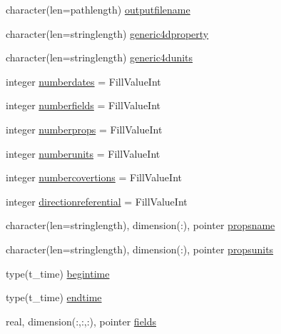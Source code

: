 \begin{DoxyCompactItemize}
\item 
character(len=pathlength) \mbox{\hyperlink{structmodulereadswannonstationary_1_1t__swan_a1fa9a8c9c48380839314e5e4dc5705a4}{outputfilename}}
\item 
character(len=stringlength) \mbox{\hyperlink{structmodulereadswannonstationary_1_1t__swan_a4e9260c8b4defd2db378d4c9a5763238}{generic4dproperty}}
\item 
character(len=stringlength) \mbox{\hyperlink{structmodulereadswannonstationary_1_1t__swan_af4045afaf35a49e30f9b3718878a1f3e}{generic4dunits}}
\item 
integer \mbox{\hyperlink{structmodulereadswannonstationary_1_1t__swan_a62049c9cf9b6dd46e3d59905b1fd81ed}{numberdates}} = Fill\+Value\+Int
\item 
integer \mbox{\hyperlink{structmodulereadswannonstationary_1_1t__swan_a2b55b2761fd9dbfbfcb9f3d0b2caace2}{numberfields}} = Fill\+Value\+Int
\item 
integer \mbox{\hyperlink{structmodulereadswannonstationary_1_1t__swan_a56ada64abca75768d7a40cfd89090501}{numberprops}} = Fill\+Value\+Int
\item 
integer \mbox{\hyperlink{structmodulereadswannonstationary_1_1t__swan_a96880eace678742c5bff0a27774dec42}{numberunits}} = Fill\+Value\+Int
\item 
integer \mbox{\hyperlink{structmodulereadswannonstationary_1_1t__swan_a8d4bb5fd6cf343058659b3985c1d04d7}{numbercovertions}} = Fill\+Value\+Int
\item 
integer \mbox{\hyperlink{structmodulereadswannonstationary_1_1t__swan_a423a265c88b51b32f5287d3d16990d5e}{directionreferential}} = Fill\+Value\+Int
\item 
character(len=stringlength), dimension(\+:), pointer \mbox{\hyperlink{structmodulereadswannonstationary_1_1t__swan_ae60e13b2097f9500354ba061c0ebce45}{propsname}}
\item 
character(len=stringlength), dimension(\+:), pointer \mbox{\hyperlink{structmodulereadswannonstationary_1_1t__swan_a1d4033a6cb5653e96a7698daf9b70baf}{propsunits}}
\item 
type(t\+\_\+time) \mbox{\hyperlink{structmodulereadswannonstationary_1_1t__swan_ab446d8e5935a991eaedb98b43cf1a62d}{begintime}}
\item 
type(t\+\_\+time) \mbox{\hyperlink{structmodulereadswannonstationary_1_1t__swan_a28eede6be3de23c4a08d1466edfc92de}{endtime}}
\item 
real, dimension(\+:,\+:,\+:), pointer \mbox{\hyperlink{structmodulereadswannonstationary_1_1t__swan_a5bd12fde4394daa7ca0a4c2dac3b4115}{fields}}

\end{DoxyCompactItemize}
